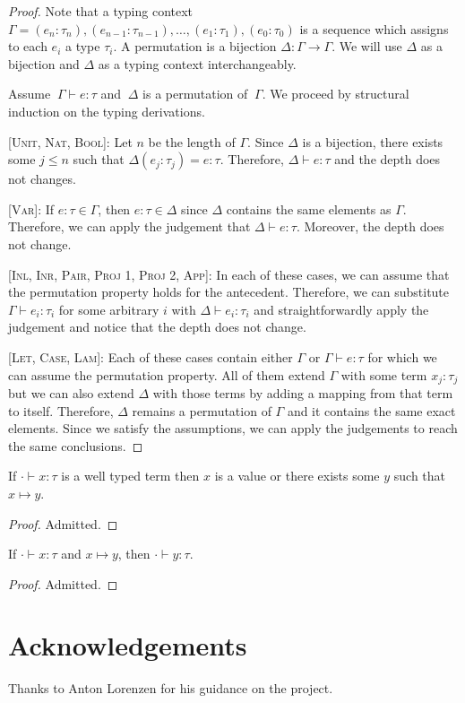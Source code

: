 \documentclass[nonacm]{acmart}
\begin{document}
  \begin{proof}
    Note that a typing context $\Gamma = (e_n : \tau_n), (e_{n - 1} : \tau_{n - 1}), \dots,
    (e_1 : \tau_1), (e_0 : \tau_0)$ is a sequence which assigns to each $e_i$ a type $\tau_i$.
    A permutation is a bijection $\Delta : \Gamma \rightarrow \Gamma$. We will use
    $\Delta$ as a bijection and $\Delta$ as a typing context interchangeably.

    Assume $~\Gamma \vdash e : \tau$ and $~\Delta$ is a permutation of $~\Gamma$.
    We proceed by structural induction on the typing derivations.

    [\textsc{Unit, Nat, Bool}]: Let $n$ be the length of $\Gamma$. Since $\Delta$ is a bijection,
    there exists some $j \leq n$ such that $\Delta(e_j : \tau_j) = e : \tau$.
    Therefore, $\Delta \vdash e : \tau$ and the depth does not changes.

    [\textsc{Var}]: If $e : \tau \in \Gamma$, then $e : \tau \in \Delta$ since
    $\Delta$ contains the same elements as $\Gamma$. Therefore, we can apply the
    judgement that $\Delta \vdash e : \tau$. Moreover, the depth does not change.

    [\textsc{Inl, Inr, Pair, Proj 1, Proj 2, App}]: In each of these cases, we can
    assume that the permutation property holds for the antecedent. Therefore,
    we can substitute $\Gamma \vdash e_{i} : \tau_{i}$ for some arbitrary $i$ with
    $\Delta \vdash e_{i} : \tau_{i}$ and straightforwardly apply the judgement
    and notice that the depth does not change.

    [\textsc{Let, Case, Lam}]: Each of these cases contain either $\Gamma$ or
    $\Gamma \vdash e : \tau$ for which we can assume the permutation property.
    All of them extend $\Gamma$ with some term $x_j : \tau_j$ but we can also
    extend $\Delta$ with those terms by adding a mapping from that term to itself.
    Therefore, $\Delta$ remains a permutation of $\Gamma$ and it contains the same
    exact elements. Since we satisfy the assumptions, we can apply the judgements
    to reach the same conclusions.


  \end{proof}

  \begin{theorem}[Progress]
    If $\cdot \vdash x : \tau$ is a well typed term then $x$ is a value or there
    exists some $y$ such that $x \mapsto y$.
  \end{theorem}

  \begin{proof}
    Admitted.
  \end{proof}

  \begin{theorem}[Preservation]
    If $\cdot \vdash x : \tau$ and $x \mapsto y$, then $\cdot \vdash y : \tau$.
  \end{theorem}

  \begin{proof}
    Admitted.
  \end{proof}


  \section{Acknowledgements}

  Thanks to Anton Lorenzen for his guidance on the project.

  \printbibliography
\end{document}
